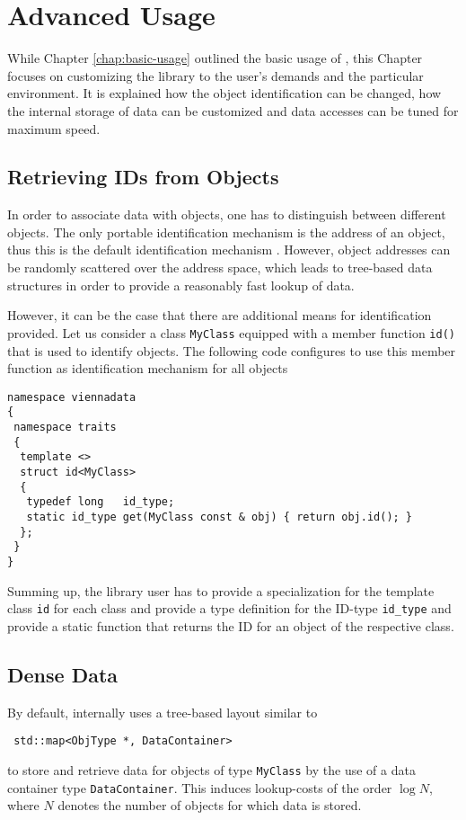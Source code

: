 \chapter{Advanced Usage} \label{chap:advanced-usage}

While Chapter \ref{chap:basic-usage} outlined the basic usage of {\ViennaData}, this Chapter focuses
on customizing the library to the user's demands and the particular environment. It is explained how
the object identification can be changed, how the internal storage of data can be customized and data
accesses can be tuned for maximum speed.

\section{Retrieving IDs from Objects} \label{sec:id-retrieval}
In order to associate data with objects, one has to distinguish between different objects. The only portable identification mechanism
is the address of an object, thus this is the default identification mechanism {\ViennaData}.
However, object addresses can be randomly scattered over the address space, which leads to tree-based data structures in order to
provide a reasonably fast lookup of data.

However, it can be the case that there are additional means for identification provided.
Let us consider a class \lstinline|MyClass| equipped with a member function \lstinline|id()| that
is used to identify objects. The following code configures {\ViennaData} to use this member function
as identification mechanism for all objects
\begin{lstlisting}
namespace viennadata
{
 namespace traits
 {
  template <>
  struct id<MyClass>
  {
   typedef long   id_type;
   static id_type get(MyClass const & obj) { return obj.id(); }
  };
 }
}
\end{lstlisting}
Summing up, the library user has to provide a specialization for the template class \lstinline|id|
for each class and provide a type definition for the ID-type \lstinline|id_type| and provide a static
function that returns the ID for an object of the respective class.

\section{Dense Data} \label{sec:dense-data}
By default, {\ViennaData} internally uses a tree-based layout similar to
\begin{lstlisting}
 std::map<ObjType *, DataContainer>
\end{lstlisting}
to store and retrieve data for objects of type \lstinline|MyClass| by the use of a data container type \lstinline|DataContainer|.
This induces lookup-costs of the order $\log N$, where $N$ denotes the number of objects for which data is stored.

